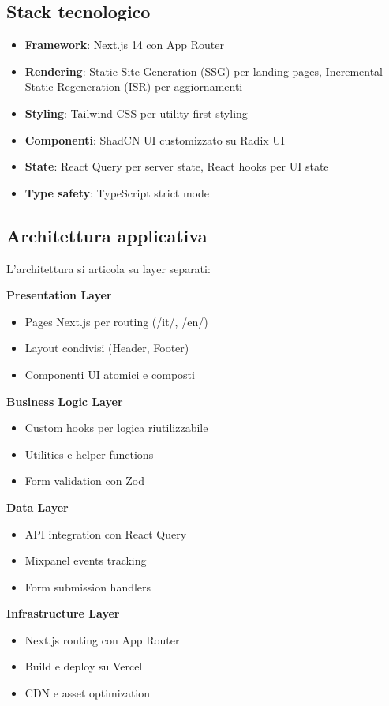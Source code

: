 \subsection{Stack tecnologico}
\begin{itemize}
  \item \textbf{Framework}: Next.js 14 con App Router
  \item \textbf{Rendering}: Static Site Generation (SSG) per landing 
        pages, Incremental Static Regeneration (ISR) per aggiornamenti
  \item \textbf{Styling}: Tailwind CSS per utility-first styling
  \item \textbf{Componenti}: ShadCN UI customizzato su Radix UI
  \item \textbf{State}: React Query per server state, React hooks per 
        UI state
  \item \textbf{Type safety}: TypeScript strict mode
\end{itemize}

\subsection{Architettura applicativa}
L'architettura si articola su layer separati:

\textbf{Presentation Layer}
\begin{itemize}
  \item Pages Next.js per routing (/it/, /en/)
  \item Layout condivisi (Header, Footer)
  \item Componenti UI atomici e composti
\end{itemize}

\textbf{Business Logic Layer}
\begin{itemize}
  \item Custom hooks per logica riutilizzabile
  \item Utilities e helper functions
  \item Form validation con Zod
\end{itemize}

\textbf{Data Layer}
\begin{itemize}
  \item API integration con React Query
  \item Mixpanel events tracking
  \item Form submission handlers
\end{itemize}

\textbf{Infrastructure Layer}
\begin{itemize}
  \item Next.js routing con App Router
  \item Build e deploy su Vercel
  \item CDN e asset optimization
\end{itemize}


